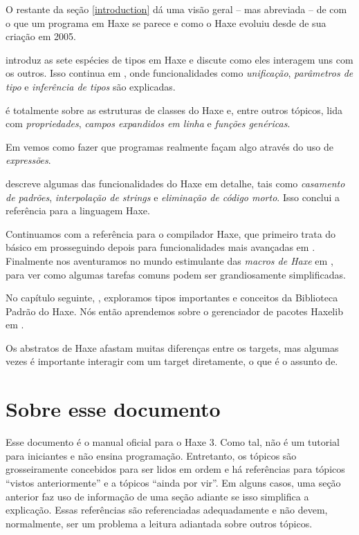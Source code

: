 O restante da seção \ref{introduction} dá uma visão geral – mas abreviada – de com o que um programa em Haxe se parece e como o Haxe evoluiu desde de sua criação em 2005.

 introduz as sete espécies de tipos em Haxe e discute como eles interagem uns com os outros. Isso continua em , onde funcionalidades como \emph{unificação}, \emph{parâmetros de tipo} e \emph{inferência de tipos} são explicadas.

 é totalmente sobre as estruturas de classes do Haxe e, entre outros tópicos, lida com \emph{propriedades}, \emph{campos expandidos em linha} e \emph{funções genéricas}.

Em  vemos como fazer que programas realmente façam algo através do uso de \emph{expressões}.

 descreve algumas das funcionalidades do Haxe em detalhe, tais como \emph{casamento de padrões}, \emph{interpolação de strings} e \emph{eliminação de código morto}. Isso conclui a referência para a linguagem Haxe.

Continuamos com a referência para o compilador Haxe, que primeiro trata do básico em  prosseguindo depois para funcionalidades mais avançadas em . Finalmente nos aventuramos no mundo estimulante das \emph{macros de Haxe} em , para ver como algumas tarefas comuns podem ser grandiosamente simplificadas.

No capítulo seguinte, , exploramos tipos importantes e conceitos da Biblioteca Padrão do Haxe. Nós então aprendemos sobre o gerenciador de pacotes Haxelib em .

Os abstratos de Haxe afastam muitas diferenças entre os targets, mas algumas vezes é importante interagir com um target diretamente, o que é o assunto de.

\section{Sobre esse documento}
\label{introduction-about-this-document}

Esse documento é o manual oficial para o Haxe 3. Como tal, não é um tutorial para iniciantes e não ensina programação. Entretanto, os tópicos são grosseiramente concebidos para ser lidos em ordem e há referências para tópicos ``vistos anteriormente'' e a tópicos ``ainda por vir''. Em alguns casos, uma seção anterior faz uso de informação de uma seção adiante se isso simplifica a explicação. Essas referências são referenciadas adequadamente e não devem, normalmente, ser um problema a leitura adiantada sobre outros tópicos.

